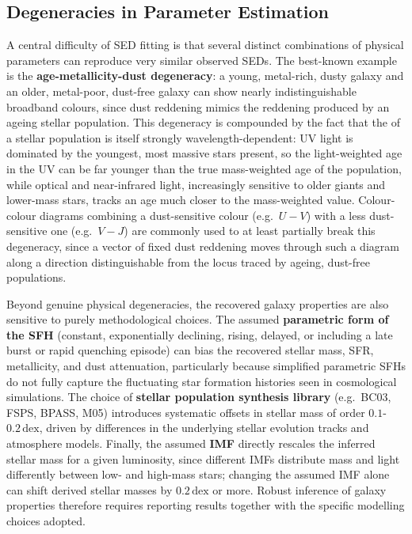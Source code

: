 \subsection{Degeneracies in Parameter Estimation} \label{subsec:sed_degeneracies}

A central difficulty of SED fitting is that several distinct combinations of physical parameters can reproduce very similar observed SEDs. The best-known example is the \textbf{age-metallicity-dust degeneracy}: a young, metal-rich, dusty galaxy and an older, metal-poor, dust-free galaxy can show nearly indistinguishable broadband colours, since dust reddening mimics the reddening produced by an ageing stellar population. This degeneracy is compounded by the fact that the  of a stellar population is itself strongly wavelength-dependent: UV light is dominated by the youngest, most massive stars present, so the light-weighted age in the UV can be far younger than the true mass-weighted age of the population, while optical and near-infrared light, increasingly sensitive to older giants and lower-mass stars, tracks an age much closer to the mass-weighted value. Colour-colour diagrams combining a dust-sensitive colour (e.g.\ $U-V$) with a less dust-sensitive one (e.g.\ $V-J$) are commonly used to at least partially break this degeneracy, since a vector of fixed dust reddening moves through such a diagram along a direction distinguishable from the locus traced by ageing, dust-free populations.

\begin{observationblock}
Beyond genuine physical degeneracies, the recovered galaxy properties are also sensitive to purely methodological choices. The assumed \textbf{parametric form of the SFH} (constant, exponentially declining, rising, delayed, or including a late burst or rapid quenching episode) can bias the recovered stellar mass, SFR, metallicity, and dust attenuation, particularly because simplified parametric SFHs do not fully capture the fluctuating star formation histories seen in cosmological simulations. The choice of \textbf{stellar population synthesis library} (e.g.\ BC03, FSPS, BPASS, M05) introduces systematic offsets in stellar mass of order $0.1$-$0.2\,\text{dex}$, driven by differences in the underlying stellar evolution tracks and atmosphere models. Finally, the assumed \textbf{IMF} directly rescales the inferred stellar mass for a given luminosity, since different IMFs distribute mass and light differently between low- and high-mass stars; changing the assumed IMF alone can shift derived stellar masses by $0.2\,\text{dex}$ or more. Robust inference of galaxy properties therefore requires reporting results together with the specific modelling choices adopted.
\end{observationblock}

